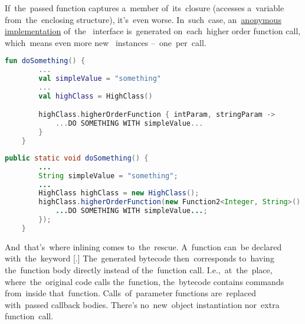 If~the~passed function captures a~member of~its~closure (accesses a~variable from~the~enclosing structure), it's~even worse.
In~such~case, an~\hyperref[javaanonymousclass]{anonymous implementation} of~the~ interface is~generated on~each~higher order function call, which~means even more new~ instances --~one~per~call.

\example
\begin{lstlisting}[language=Kotlin, title={Higher order function accessing a member of its closure}]
    fun doSomething() {
        ...
        val simpleValue = "something"
        ...
        val highClass = HighClass()

        highClass.higherOrderFunction { intParam, stringParam ->
            ...DO SOMETHING WITH simpleValue...
        }
    }
\end{lstlisting}
\begin{lstlisting}[language=Java, title={Rough Java equivalent of the generated bytecode}]
    public static void doSomething() {
        ...
        String simpleValue = "something";
        ...
        HighClass highClass = new HighClass();
        highClass.higherOrderFunction(new Function2<Integer, String>() {
            ...DO SOMETHING WITH simpleValue...;
        });
    }
\end{lstlisting}
\newline

\noindent And~that's~where inlining comes to~the~rescue.
A~function can~be declared with~the~keyword [.]
The~generated bytecode then~corresponds to~having the~function body directly instead of the~function call.
I.e.,~at~the~place, where~the~original code calls the~function, the~bytecode contains commands from~inside that~function.
Calls~of~parameter functions are~replaced with~passed callback bodies.
There's no~new~object instantiation nor~extra function~call.

